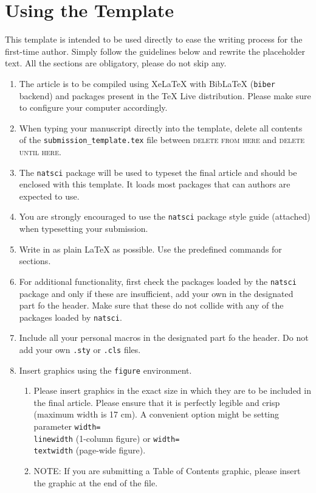 \documentclass[english]{jasb}
\begin{document}
\section*{Using the Template}
This template is intended to be used directly to ease the writing process for the first-time author. Simply follow the guidelines below and rewrite the placeholder text. All the sections are obligatory, please do not skip any.
\begin{enumerate}
\item The article is to be compiled using XeLaTeX with BibLaTeX (\texttt{biber} backend) and packages present in the TeX Live distribution. Please make sure to configure your computer accordingly.
\item When typing your manuscript directly into the template, delete all contents of the \texttt{submission\_template.tex} file between \textsc{delete from here} and \textsc{delete until here}.
\item The \texttt{natsci} package will be used to typeset the final article and should be enclosed with this template. It loads most packages that can authors are expected to use.
\item You are strongly encouraged to use the \texttt{natsci} package style guide (attached) when typesetting your submission.
\item Write in as plain \LaTeX{} as possible. Use the predefined  commands for sections.
\item For additional functionality, first check the packages loaded by the \texttt{natsci} package and only if these are insufficient, add your own in the designated part fo the header. Make sure that these do not collide with any of the packages loaded by \texttt{natsci}.
\item Include all your personal macros in the designated part fo the header. Do not add your own \texttt{.sty} or \texttt{.cls} files.
\item Insert graphics using the \texttt{figure} environment.
\begin{enumerate}
    \item Please insert graphics in the exact size in which they are to be included in the final article. Please ensure that it is perfectly legible and crisp (maximum width is 17 cm). A convenient option might be setting parameter 
        \texttt{width=\\linewidth} (1-column figure) or \texttt{width=\\textwidth} (page-wide figure).
    \item NOTE: If you are submitting a Table of Contents graphic, please insert the graphic at the end of the file.

\end{enumerate}
\end{enumerate}
\end{document}

